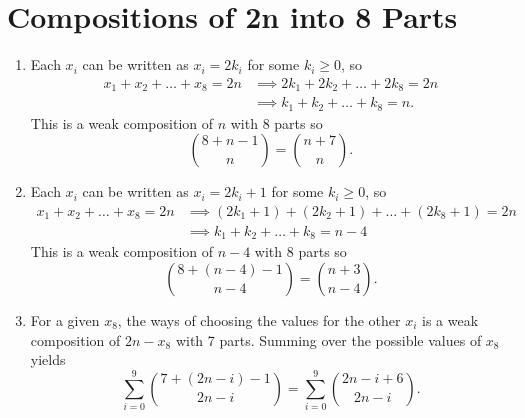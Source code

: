 \documentclass{article}
\begin{document}
\section{Compositions of 2n into 8 Parts}
      \begin{enumerate}
         \item Each $x_i$ can be written as 
            $x_i = 2k_i$ for some $k_i \geq 0$, so
            \begin{align*}
               x_1 + x_2 + \hdots + x_8 = 2n 
               &\implies 2k_1 + 2k_2 + \hdots + 2k_8 = 2n \\
               &\implies k_1 + k_2 + \hdots + k_8 = n.
            \end{align*}
            This is a weak composition of $n$ with 8 parts so
            \[ 
               \binom{8+n-1}{n} = \binom{n+7}{n}.
            \]
         \item Each $x_i$ can be written as 
            $x_i = 2k_i+1$ for some $k_i \geq 0$, so
            \begin{align*}
               x_1 + x_2 + \hdots + x_8 = 2n 
               &\implies (2k_1+1) + (2k_2+1) + \hdots + (2k_8+1) = 2n \\
               &\implies k_1 + k_2 + \hdots + k_8 = n-4
            \end{align*}
            This is a weak composition of $n-4$ with 8 parts so
            \[ 
               \binom{8+(n-4)-1}{n-4} = \binom{n+3}{n-4}.
            \]
         \item For a given $x_8$, the ways of choosing the 
         values for the other $x_i$ is a weak composition 
         of $2n-x_8$ with 7 parts.
         Summing over the possible values of $x_8$ yields 
         \[
            \sum_{i=0}^9 \binom{7+(2n-i)-1}{2n-i} = \sum_{i=0}^9 \binom{2n-i+6}{2n-i}.
         \]
      \end{enumerate}
\newpage 
\end{document}

